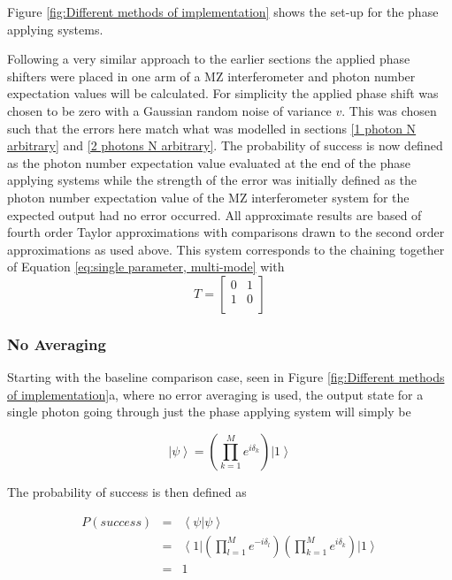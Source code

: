 \documentclass[aps,pra,twocolumn,superscriptaddress,numerical]{revtex4-1}
\begin{document}
		Figure \ref{fig:Different methods of implementation} shows the set-up for the phase applying systems.
		
		Following a very similar approach to the earlier sections the applied phase shifters were placed in one arm of a MZ interferometer and photon number expectation values will be calculated. For simplicity the applied phase shift was chosen to be zero with a Gaussian random noise of variance $v$. This was chosen such that the errors here match what was modelled in sections \ref{1 photon N arbitrary} and \ref{2 photons N arbitrary}. The probability of success is now defined as the photon number expectation value evaluated at the end of the phase applying systems while the strength of the error was initially defined as the photon number expectation value of the MZ interferometer system for the expected output had no error occurred. All approximate results are based of fourth order Taylor approximations with comparisons drawn to the second order approximations as used above. This system corresponds to the chaining together of Equation \ref{eq:single parameter, multi-mode} with 
		\begin{equation}
		T=\begin{bmatrix}
			0 & 1 \\
			1 & 0 \\
			\end{bmatrix}
		\end{equation}
			
		
		\subsubsection{No Averaging\label{No Averaging}}
		
		Starting with the baseline comparison case, seen in Figure \ref{fig:Different methods of implementation}a, where no error averaging is used, the output state for a single photon going through just the phase applying system will simply be
		
		\begin{equation}
		\left|\psi\right\rangle =\left(\prod_{k=1}^{M}e^{i\delta_{k}}\right)\left|1\right\rangle \label{eq:noAvPhaseState}
		\end{equation}
		
		
		The probability of success is then defined as
		
		\begin{eqnarray}
		P\left(success\right) & = & \left\langle \psi|\psi\right\rangle \nonumber \\
		& = & \left\langle 1\right|\left(\prod_{l=1}^{M}e^{-i\delta_{l}}\right)\left(\prod_{k=1}^{M}e^{i\delta_{k}}\right)\left|1\right\rangle \nonumber \\
		& = & 1\label{eq:noAveProbSuccess}
		\end{eqnarray}
		
\end{document}
